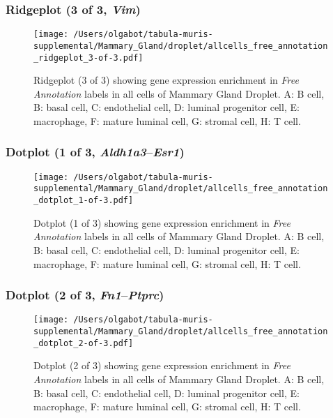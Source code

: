 \clearpage

\subsubsection{Ridgeplot (3 of 3, \emph{Vim})}
\begin{figure}[h]
\centering
\texttt{[image: /Users/olgabot/tabula-muris-supplemental/Mammary\_Gland/droplet/allcells\_free\_annotation\_ridgeplot\_3-of-3.pdf]}

\caption{ Ridgeplot (3 of 3)  showing gene expression enrichment in \emph{Free Annotation} labels in all cells of Mammary Gland Droplet. A: B cell, B: basal cell, C: endothelial cell, D: luminal progenitor cell, E: macrophage, F: mature luminal cell, G: stromal cell, H: T cell.}
\end{figure}


\clearpage

\subsubsection{Dotplot (1 of 3, \emph{Aldh1a3}--\emph{Esr1})}
\begin{figure}[h]
\centering
\texttt{[image: /Users/olgabot/tabula-muris-supplemental/Mammary\_Gland/droplet/allcells\_free\_annotation\_dotplot\_1-of-3.pdf]}

\caption{ Dotplot (1 of 3)  showing gene expression enrichment in \emph{Free Annotation} labels in all cells of Mammary Gland Droplet. A: B cell, B: basal cell, C: endothelial cell, D: luminal progenitor cell, E: macrophage, F: mature luminal cell, G: stromal cell, H: T cell.}
\end{figure}


\clearpage

\subsubsection{Dotplot (2 of 3, \emph{Fn1}--\emph{Ptprc})}
\begin{figure}[h]
\centering
\texttt{[image: /Users/olgabot/tabula-muris-supplemental/Mammary\_Gland/droplet/allcells\_free\_annotation\_dotplot\_2-of-3.pdf]}

\caption{ Dotplot (2 of 3)  showing gene expression enrichment in \emph{Free Annotation} labels in all cells of Mammary Gland Droplet. A: B cell, B: basal cell, C: endothelial cell, D: luminal progenitor cell, E: macrophage, F: mature luminal cell, G: stromal cell, H: T cell.}
\end{figure}


